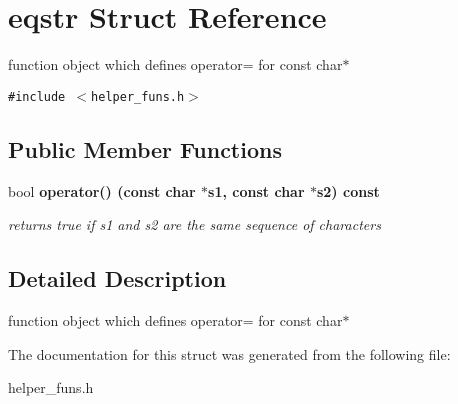 \section{eqstr Struct Reference}
\label{structeqstr}
function object which defines operator= for const char$\ast$  


{\tt \#include $<$helper\_\-funs.h$>$}

\subsection*{Public Member Functions}
\begin{CompactItemize}
\item 
bool \bf{operator()} (const char $\ast$s1, const char $\ast$s2) const \label{structeqstr_eaa5304f3a78d29601f6103fed3a5e54}

\begin{CompactList}\small\item\em returns true if s1 and s2 are the same sequence of characters \item\end{CompactList}\end{CompactItemize}


\subsection{Detailed Description}
function object which defines operator= for const char$\ast$ 



The documentation for this struct was generated from the following file:\begin{CompactItemize}
\item 
helper\_\-funs.h\end{CompactItemize}
